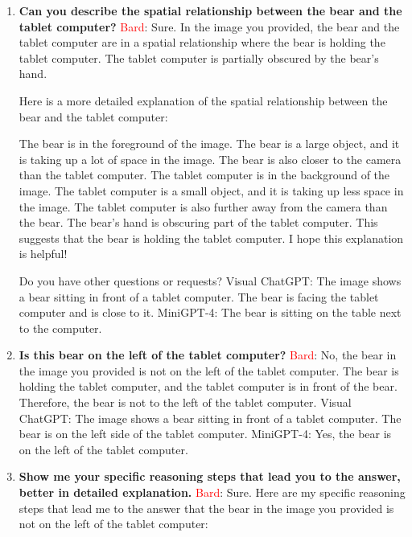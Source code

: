 \begin{enumerate}
    \item \textbf{Can you describe the spatial relationship between the bear and the tablet computer?}
    \subitem \textcolor{Red}{Bard}: Sure. In the image you provided, the bear and the tablet computer are in a spatial relationship where the bear is holding the tablet computer. The tablet computer is partially obscured by the bear's hand.

    Here is a more detailed explanation of the spatial relationship between the bear and the tablet computer:
    
    The bear is in the foreground of the image. The bear is a large object, and it is taking up a lot of space in the image. The bear is also closer to the camera than the tablet computer.
    The tablet computer is in the background of the image. The tablet computer is a small object, and it is taking up less space in the image. The tablet computer is also further away from the camera than the bear.
    The bear's hand is obscuring part of the tablet computer. This suggests that the bear is holding the tablet computer.
    I hope this explanation is helpful!
    
    Do you have other questions or requests?    
    \subitem Visual ChatGPT: The image shows a bear sitting in front of a tablet computer. The bear is facing the tablet computer and is close to it.
    \subitem MiniGPT-4: The bear is sitting on the table next to the computer.
    \item \textbf{Is this bear on the left of the tablet computer?}
    \subitem \textcolor{Red}{Bard}: 
    No, the bear in the image you provided is not on the left of the tablet computer. The bear is holding the tablet computer, and the tablet computer is in front of the bear. Therefore, the bear is not to the left of the tablet computer.
    \subitem Visual ChatGPT: The image shows a bear sitting in front of a tablet computer. The bear is on the left side of the tablet computer.
    \subitem MiniGPT-4: Yes, the bear is on the left of the tablet computer.
    \item \textbf{Show me your specific reasoning steps that lead you to the answer, better in detailed explanation.}
    \subitem \textcolor{Red}{Bard}: 
    Sure. Here are my specific reasoning steps that lead me to the answer that the bear in the image you provided is not on the left of the tablet computer:
    

\end{enumerate}
